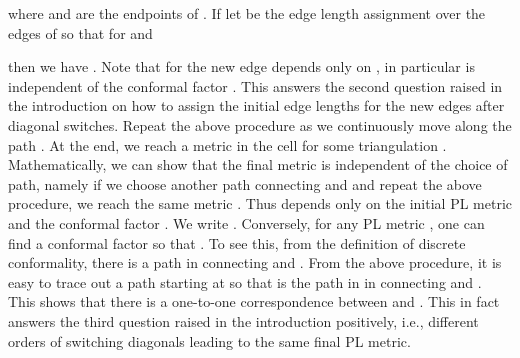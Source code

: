 \documentclass[11pt]{article}
\begin{document}
where  and  are the endpoints of .
If let  be the edge length assignment over the 
edges of  so that  for  and 

then we have . Note that  for the new edge  
depends only on , in particular is independent of the conformal factor .  
This answers the second question raised in the introduction on how to assign the initial edge lengths
for the new edges after diagonal switches. 
Repeat the above procedure as we continuously move along the path . At the end, 
we reach a metric  in the cell   
for some triangulation . Mathematically, we can show that the final metric  is independent 
of the choice of path, namely if we choose another path connecting  and  and repeat the above
procedure, we reach the same metric . Thus  depends only on the initial PL metric  and the 
conformal factor . We write .  Conversely, for any PL metric , one can find a conformal
factor  so that . To see this, from the definition of discrete conformality, 
there is a path in  connecting  and . From the above procedure, it is easy to trace out 
a path  starting at  so that  is the path 
in  in  connecting  and . This shows that there is 
a one-to-one correspondence between  and . This in fact answers the third question 
raised in the introduction positively, i.e., different orders of switching diagonals leading to 
the same final PL metric.
\end{document}
